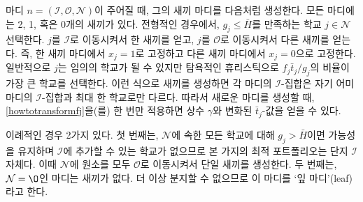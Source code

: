 \documentclass[11pt]{article} %
\newif\ifen
\theoremstyle{definition}
\theoremstyle{definition}
\begin{document}
\ifen 
Given a node $n  = (\mathcal{I}, \mathcal{O}, \mathcal{N})$, its children are generated as follows. Every node has two, one, or zero children. In the typical case, we select a school $j \in \mathcal{N}$ for which $g_j \leq \bar H$ and generate one child by moving $j$ to $\mathcal{I}$, and another child by moving $j$ it to $\mathcal{O}$. Equivalently, we set $x_j = 1$ in one child and $x_j = 0$ in the other. In principle, any school can be chosen for $j$, but as a greedy heuristic, we choose the school for which the ratio $f_j \bar t_j / g_j$ is highest. Notice that this method of generating children ensures that each node's $\mathcal{I}$-set differs from its parent's by at most a single school, so the constant $\gamma$ and transformed $\bar t_j$-values for the new node can be obtained by a single application of \eqref{howtotransformfj}. 
\else
마디  $n  = (\mathcal{I}, \mathcal{O}, \mathcal{N})$이 주어질 때, 그의 새끼 마디를 다음처럼 생성한다. 모든 마디에는 2, 1, 혹은 0개의 새끼가 있다. 전형적인 경우에서, $g_j \leq \bar H$를 만족하는 학교 $j \in \mathcal{N}$ 선택한다. $j$를 $\mathcal{I}$로 이동시켜서 한 새끼를 얻고, $j$를 $\mathcal{O}$로 이동시켜서 다른 새끼를 얻는다. 즉, 한 새끼 마디에서 $x_j = 1$로 고정하고 다른 새끼 마디에서 $x_j = 0$으로 고정한다. 일반적으로 $j$는 임의의 학교가 될 수 있지만 탐욕적인 휴리스틱으로 $f_j \bar t_j / g_j$의 비율이 가장 큰 학교를 선택한다. 이런 식으로 새끼를 생성하면 각 마디의 $\mathcal{I}$-집합은 자기 어미 마디의 $\mathcal{I}$-집합과 최대 한 학교로만 다르다. 따라서 새로운 마디를 생성할 때, \eqref{howtotransformfj}을(를) 한 번만 적용하면 상수 $\gamma$와 변화된 $\bar t_j$-값을 얻을 수 있다.
\fi

\ifen
There are two atypical cases. First, if every school in $\mathcal{N}$ has $g_j > \bar H$, then there is no school that can be added to $\mathcal{I}$ in a feasible portfolio, and the optimal portfolio on this branch is $\mathcal{I}$ itself. In this case, we generate only one child by moving all the schools from $\mathcal{N}$ to $\mathcal{O}$. Second, if $\mathcal{N} = \O$, then the node has zero children, and as no further branching is possible, the node is called a \emph{leaf.}
\else
이례적인 경우 2가지 있다. 첫 번째는, $\mathcal{N}$에 속한 모든 학교에 대해 $g_j > \bar H$이면 가능성을 유지하며 $\mathcal{I}$에 추가할 수 있는 학교가 없으므로 본 가지의 최적 포트폴리오는 단지 $\mathcal{I}$ 자체다. 이때 $\mathcal{N}$에 원소를 모두 $\mathcal{O}$로 이동시켜서 단일 새끼를 생성한다. 두 번째는, $\mathcal{N} = \O$인 마디는 새끼가 없다. 더 이상 분지할 수 없으므로 이 마디를 `잎 마디'(leaf)라고 한다.
\fi
\end{document}
